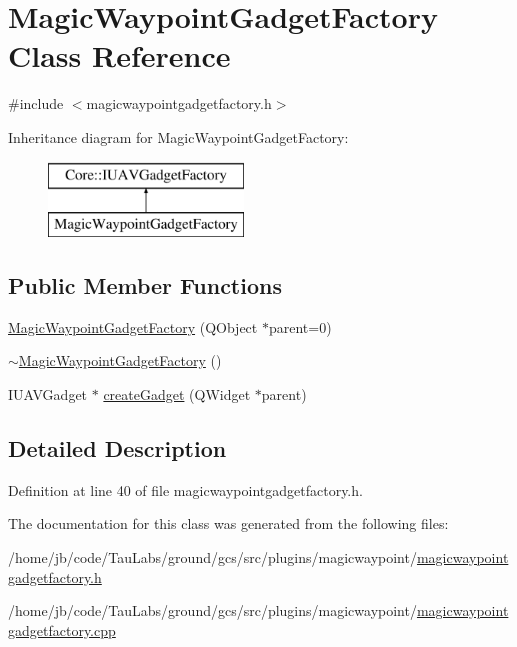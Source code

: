 \hypertarget{class_magic_waypoint_gadget_factory}{\section{\-Magic\-Waypoint\-Gadget\-Factory \-Class \-Reference}
\label{class_magic_waypoint_gadget_factory}
}


{\ttfamily \#include $<$magicwaypointgadgetfactory.\-h$>$}

\-Inheritance diagram for \-Magic\-Waypoint\-Gadget\-Factory\-:\begin{figure}[H]
\begin{center}
\leavevmode
\includegraphics[height=2.000000cm]{class_magic_waypoint_gadget_factory}
\end{center}
\end{figure}
\subsection*{\-Public \-Member \-Functions}
\begin{DoxyCompactItemize}
\item 
\hyperlink{group___g_c_s_control_gadget_plugin_gae7ad3cb8d55b05f06354047f33941fc1}{\-Magic\-Waypoint\-Gadget\-Factory} (\-Q\-Object $\ast$parent=0)
\item 
\hyperlink{group___g_c_s_control_gadget_plugin_ga0b16d239f1aa3859ed11c4a572a9e5fd}{$\sim$\-Magic\-Waypoint\-Gadget\-Factory} ()
\item 
\-I\-U\-A\-V\-Gadget $\ast$ \hyperlink{group___g_c_s_control_gadget_plugin_gac8c3a2facf7fe1515b2d277b58ee9d0b}{create\-Gadget} (\-Q\-Widget $\ast$parent)
\end{DoxyCompactItemize}


\subsection{\-Detailed \-Description}


\-Definition at line 40 of file magicwaypointgadgetfactory.\-h.



\-The documentation for this class was generated from the following files\-:\begin{DoxyCompactItemize}
\item 
/home/jb/code/\-Tau\-Labs/ground/gcs/src/plugins/magicwaypoint/\hyperlink{magicwaypointgadgetfactory_8h}{magicwaypointgadgetfactory.\-h}\item 
/home/jb/code/\-Tau\-Labs/ground/gcs/src/plugins/magicwaypoint/\hyperlink{magicwaypointgadgetfactory_8cpp}{magicwaypointgadgetfactory.\-cpp}\end{DoxyCompactItemize}
